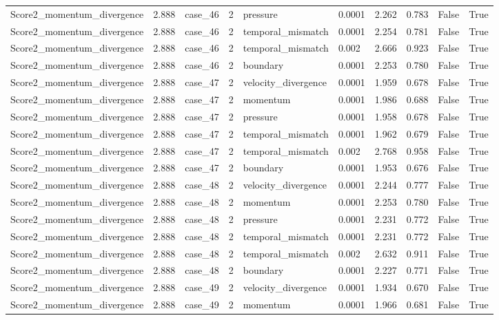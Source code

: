\begin{longtable}{llllllllll}
Score2\_momentum\_divergence & 2.888 & case\_46 & 2 & pressure & 0.0001 & 2.262 & 0.783 & False & True \\
Score2\_momentum\_divergence & 2.888 & case\_46 & 2 & temporal\_mismatch & 0.0001 & 2.254 & 0.781 & False & True \\
Score2\_momentum\_divergence & 2.888 & case\_46 & 2 & temporal\_mismatch & 0.002 & 2.666 & 0.923 & False & True \\
Score2\_momentum\_divergence & 2.888 & case\_46 & 2 & boundary & 0.0001 & 2.253 & 0.780 & False & True \\
Score2\_momentum\_divergence & 2.888 & case\_47 & 2 & velocity\_divergence & 0.0001 & 1.959 & 0.678 & False & True \\
Score2\_momentum\_divergence & 2.888 & case\_47 & 2 & momentum & 0.0001 & 1.986 & 0.688 & False & True \\
Score2\_momentum\_divergence & 2.888 & case\_47 & 2 & pressure & 0.0001 & 1.958 & 0.678 & False & True \\
Score2\_momentum\_divergence & 2.888 & case\_47 & 2 & temporal\_mismatch & 0.0001 & 1.962 & 0.679 & False & True \\
Score2\_momentum\_divergence & 2.888 & case\_47 & 2 & temporal\_mismatch & 0.002 & 2.768 & 0.958 & False & True \\
Score2\_momentum\_divergence & 2.888 & case\_47 & 2 & boundary & 0.0001 & 1.953 & 0.676 & False & True \\
Score2\_momentum\_divergence & 2.888 & case\_48 & 2 & velocity\_divergence & 0.0001 & 2.244 & 0.777 & False & True \\
Score2\_momentum\_divergence & 2.888 & case\_48 & 2 & momentum & 0.0001 & 2.253 & 0.780 & False & True \\
Score2\_momentum\_divergence & 2.888 & case\_48 & 2 & pressure & 0.0001 & 2.231 & 0.772 & False & True \\
Score2\_momentum\_divergence & 2.888 & case\_48 & 2 & temporal\_mismatch & 0.0001 & 2.231 & 0.772 & False & True \\
Score2\_momentum\_divergence & 2.888 & case\_48 & 2 & temporal\_mismatch & 0.002 & 2.632 & 0.911 & False & True \\
Score2\_momentum\_divergence & 2.888 & case\_48 & 2 & boundary & 0.0001 & 2.227 & 0.771 & False & True \\
Score2\_momentum\_divergence & 2.888 & case\_49 & 2 & velocity\_divergence & 0.0001 & 1.934 & 0.670 & False & True \\
Score2\_momentum\_divergence & 2.888 & case\_49 & 2 & momentum & 0.0001 & 1.966 & 0.681 & False & True \\

\end{longtable}
